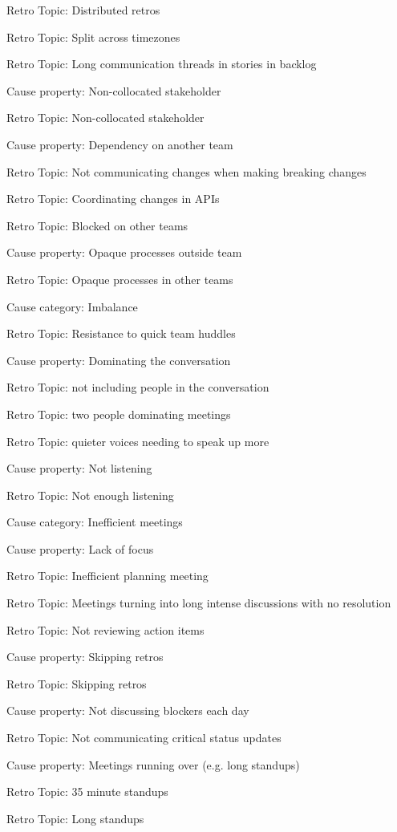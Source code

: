 \quad \quad \quad Retro Topic: Distributed retros

\quad \quad \quad Retro Topic: Split across timezones

\quad \quad \quad Retro Topic: Long communication threads in stories in backlog

\quad \quad Cause property: Non-collocated stakeholder

\quad \quad \quad Retro Topic: Non-collocated stakeholder

\quad \quad Cause property: Dependency on another team

\quad \quad \quad Retro Topic: Not communicating changes when making breaking changes

\quad \quad \quad Retro Topic: Coordinating changes in APIs

\quad \quad \quad Retro Topic: Blocked on other teams

\quad \quad Cause property: Opaque processes outside team

\quad \quad \quad Retro Topic: Opaque processes in other teams

\quad Cause category: Imbalance

\quad \quad Retro Topic: Resistance to quick team huddles

\quad \quad Cause property: Dominating the conversation

\quad \quad \quad Retro Topic: not including people in the conversation

\quad \quad \quad Retro Topic: two people dominating meetings

\quad \quad \quad Retro Topic: quieter voices needing to speak up more

\quad \quad Cause property: Not listening

\quad \quad \quad Retro Topic: Not enough listening

\quad Cause category: Inefficient meetings

\quad \quad Cause property: Lack of focus

\quad \quad \quad Retro Topic: Inefficient planning meeting

\quad \quad \quad Retro Topic: Meetings turning into long intense discussions with no resolution

\quad \quad \quad Retro Topic: Not reviewing action items

\quad \quad Cause property: Skipping retros

\quad \quad \quad Retro Topic: Skipping retros

\quad \quad Cause property: Not discussing blockers each day

\quad \quad \quad Retro Topic: Not communicating critical status updates

\quad \quad Cause property: Meetings running over (e.g. long standups)

\quad \quad \quad Retro Topic: 35 minute standups

\quad \quad \quad Retro Topic: Long standups

